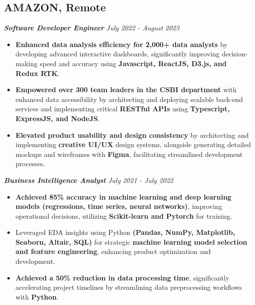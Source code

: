 \documentclass[10pt,a4paper]{article}
\begin{document}
\subsection*{AMAZON, Remote}
{\fontsize{11}{12} \textbf{\textit{Software Developer Engineer}}} \hfill \textit{July 2022 - August 2023}
\begin{itemize}[noitemsep]
    \item \textbf{Enhanced data analysis efficiency for 2,000+ data analysts} by developing advanced interactive dashboards, significantly improving decision-making speed and accuracy using \textbf{Javascript, ReactJS, D3.js, and Redux RTK}.
    \item \textbf{Empowered over 300 team leaders in the CSBI department} with enhanced data accessibility by architecting and deploying scalable back-end services and implementing critical \textbf{RESTful APIs } using \textbf{Typescript, ExpressJS, and NodeJS}.
    \item \textbf{Elevated product usability and design consistency} by architecting and implementing \textbf{creative UI/UX} design systems, alongside generating detailed mockups and wireframes with \textbf{Figma}, facilitating streamlined development processes.
\end{itemize}

{\fontsize{11}{12} \textbf{\textit{Business Intelligence Analyst}}} \hfill \textit{July 2021 - July 2022}
\begin{itemize}[noitemsep]
    \item \textbf{Achieved 85\% accuracy in machine learning and deep learning models (regressions, time series, neural networks)}, improving operational decisions, utilizing \textbf{Scikit-learn and Pytorch} for training.
    \item Leveraged EDA insights using Python \textbf{(Pandas, NumPy, Matplotlib, Seaborn, Altair, SQL)} for strategic \textbf{machine learning model selection and feature engineering}, enhancing product optimization and development.
    \item \textbf{Achieved a 50\% reduction in data processing time}, significantly accelerating project timelines by streamlining data preprocessing workflows with \textbf{Python}.
\end{itemize}
\end{document}
